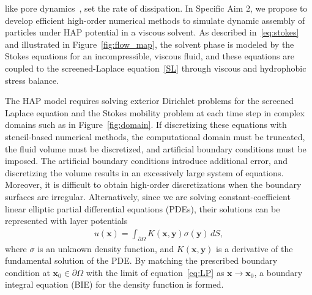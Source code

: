 like pore dynamics~\cite{RYHAM20112929}, set the rate of dissipation.
%
In Specific Aim 2, we propose to develop efficient high-order numerical
methods to simulate dynamic assembly of particles under HAP potential in
a viscous solvent. 
%
%
%
%
%
As described in~\eqref{eq:stokes} and illustrated in
Figure~\ref{fig:flow_map}, the solvent phase is modeled by the Stokes
equations for an incompressible, viscous fluid, and these equations are
coupled to the screened-Laplace equation~\eqref{SL} through viscous and
hydrophobic stress balance. 
 


The HAP model requires solving exterior Dirichlet problems for the
screened Laplace equation and the Stokes mobility problem at each time
step in complex domains such as in Figure~\ref{fig:domain}. If
discretizing these equations with stencil-based numerical methods, the
computational domain must be truncated, the fluid volume must be
discretized, and artificial boundary conditions must be imposed. The
artificial boundary conditions introduce additional error, and
discretizing the volume results in an excessively large system of
equations. Moreover, it is difficult to obtain high-order
discretizations when the boundary surfaces are irregular. Alternatively,
since we are solving constant-coefficient linear elliptic
partial differential equations (PDEs), their
solutions can be represented with layer potentials
\begin{align}
  \label{eq:LP}
  u(\mathbf{x}) = \int_{\partial\Omega} K(\mathbf{x},\mathbf{y})
  \sigma(\mathbf{y})\,dS,
\end{align}
where $\sigma$ is an unknown density function, and
$K(\mathbf{x},\mathbf{y})$ is a derivative of the fundamental solution
of the PDE. By matching the prescribed boundary condition at
$\mathbf{x}_0 \in \partial\Omega$ with the limit of
equation~\eqref{eq:LP} as $\mathbf{x}\rightarrow \mathbf{x}_0$, a
boundary integral equation (BIE) for the density function is formed. 

